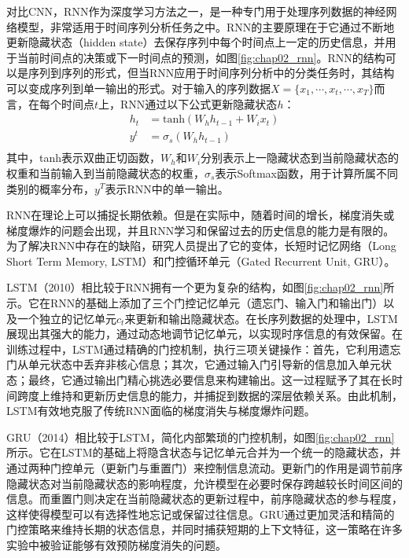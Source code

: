 对比CNN，RNN作为深度学习方法之一，是一种专门用于处理序列数据的神经网络模型，非常适用于时间序列分析任务之中。RNN的主要原理在于它通过不断地更新隐藏状态（hidden state）去保存序列中每个时间点上一定的历史信息，并用于当前时间点的决策或下一时间点的预测，如图\ref{fig:chap02_rnn}。RNN的结构可以是序列到序列的形式，但当RNN应用于时间序列分析中的分类任务时，其结构可以变成序列到单一输出的形式。对于输入的序列数据\(X = \{x_1, \cdots, x_t, \cdots, x_T\}\)而言，在每个时间点\(t\)上，RNN通过以下公式更新隐藏状态\(h\)：
\begin{equation}
  \begin{aligned}
    h_t & = \text{tanh}(W_{h}h_{t-1}+ W_{i}x_t) \\
    y^t & = \sigma_s(W_{h}h_{t-1})              \\
  \end{aligned}
\end{equation}
其中，tanh表示双曲正切函数，\(W_h\)和\(W_i\)分别表示上一隐藏状态到当前隐藏状态的权重和当前输入到当前隐藏状态的权重，\(\sigma_s\)表示Softmax函数，用于计算所属不同类别的概率分布，\(y^T\)表示RNN中的单一输出。

RNN在理论上可以捕捉长期依赖。但是在实际中，随着时间的增长，梯度消失或梯度爆炸的问题会出现，并且RNN学习和保留过去的历史信息的能力是有限的。为了解决RNN中存在的缺陷，研究人员提出了它的变体，长短时记忆网络（Long Short Term Memory, LSTM）\cite{memory2010long}和门控循环单元（Gated Recurrent Unit, GRU）\cite{chung2014empirical}。

LSTM\cite{memory2010long}（2010）相比较于RNN拥有一个更为复杂的结构，如图\ref{fig:chap02_rnn}所示。它在RNN的基础上添加了三个门控记忆单元（遗忘门、输入门和输出门）以及一个独立的记忆单元\(c_t\)来更新和输出隐藏状态。在长序列数据的处理中，LSTM展现出其强大的能力，通过动态地调节记忆单元，以实现时序信息的有效保留。在训练过程中，LSTM通过精确的门控机制，执行三项关键操作：首先，它利用遗忘门从单元状态中丢弃非核心信息；其次，它通过输入门引导新的信息加入单元状态；最终，它通过输出门精心挑选必要信息来构建输出。这一过程赋予了其在长时间跨度上维持和更新历史信息的能力，并捕捉到数据的深层依赖关系。由此机制，LSTM有效地克服了传统RNN面临的梯度消失与梯度爆炸问题。

GRU\cite{chung2014empirical}（2014）相比较于LSTM，简化内部繁琐的门控机制，如图\ref{fig:chap02_rnn}所示。它在LSTM的基础上将隐含状态与记忆单元合并为一个统一的隐藏状态，并通过两种门控单元（更新门与重置门）来控制信息流动。更新门的作用是调节前序隐藏状态对当前隐藏状态的影响程度，允许模型在必要时保存跨越较长时间区间的信息。而重置门则决定在当前隐藏状态的更新过程中，前序隐藏状态的参与程度，这样使得模型可以有选择性地忘记或保留过往信息。GRU通过更加灵活和精简的门控策略来维持长期的状态信息，并同时捕获短期的上下文特征，这一策略在许多实验中被验证能够有效预防梯度消失的问题。

